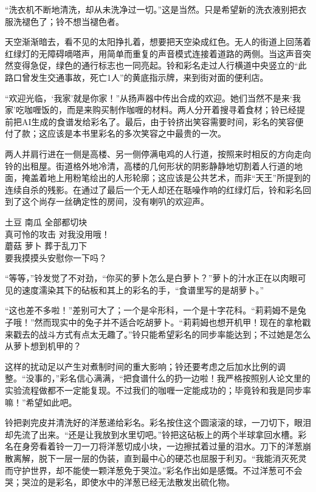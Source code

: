 “洗衣机不断地清洗，却从未洗净过一切。”这是当然。只是希望新的洗衣液别把衣服洗褪色了；铃不想当褪色者。

天空渐渐暗去，看不见的太阳挣扎着，想要把天空染成红色。无人的街道上回荡着红绿灯的无障碍嘀嗒声，用简单而重复的声音模式连接着道路的两侧。当这声音突然变得急促，绿色的通行标志也一同亮起。铃和彩名走过人行横道中央竖立的“此路口曾发生交通事故，死亡1人”的黄底指示牌，来到街对面的便利店。

“欢迎光临，‘我家’就是你家！”从扬声器中传出合成的欢迎。她们当然不是来‘我家’吃咖喱饭的，而是来购买制作咖喱的材料。两人分开着搜寻着食材；铃已经提前把AI生成的食谱发给彩名了。最后，由于铃挤出笑容需要时间，彩名的笑容便付了款；这应该是本书里彩名的多次笑容之中最贵的一次。

两人并肩行进在一侧是高楼、另一侧停满电鸡的人行道，按照来时相反的方向走向铃的出租屋。街道格外地冷清，高楼的几何形状的阴影静静地切割着人行道的地面，掩盖着地上用粉笔绘出的人形轮廓；这应该是公共艺术，而非“天王”所提到的连续自杀的残影。在通过了最后一个无人却还在聒噪作响的红绿灯后，铃和彩名回到了这个尚存一丝确定性的房间，没有喇叭的欢迎声。

\begin{song}
土豆 南瓜 全部都切块\\
真可怜的攻击 对我没用哦！\\
蘑菇 萝卜 葬于乱刀下\\
要我摸摸头安慰你一下吗？
\end{song}

“等等，”铃发觉了不对劲，“你买的萝卜怎么是白萝卜？”萝卜的汁水正在以肉眼可见的速度濡染其下的砧板和其上的彩名的手，“食谱里写的是胡萝卜。”

“这也差不多啦！”差别可大了；一个是伞形科，一个是十字花科。“莉莉姆不是兔子哦！”然而现实中的兔子并不适合吃胡萝卜。“莉莉姆也想开机甲！现在的拿枪戳来戳去的战斗方式有点太无趣了。”铃只能希望彩名的同步率能达到\fullpercent ；不过她是怎么从萝卜想到机甲的？

这样的扰动足以产生对煮制时间的重大影响；铃还要考虑之后加水比例的调整。“没事的，”彩名信心满满，“把食谱什么的扔一边啦！我严格按照别人论文里的实验流程做都不一定能\fullpercent 复现。不过我们的咖喱一定能成功的；毕竟铃和我是\fullpercent 同步率嘛！”希望如此吧。

铃把剥完皮并清洗好的洋葱递给彩名。彩名按住这个圆滚滚的球，一刀切下，眼泪却先流了出来。“还是让我放到水里切吧。”铃把这砧板上的两个半球拿回水槽。彩名在身旁看着铃一刀一刀将洋葱切成小块，一边擦拭着过量的泪水。刀下的洋葱崩散离解，脱下一层一层的伪装，直到最中心的硬芯也屈服于利刃。“我能消灭死灵而守护世界，却不能使一颗洋葱免于哭泣。”彩名作出如是感慨。不过洋葱可不会哭；哭泣的是彩名，即使水中的洋葱已经无法散发出硫化物。

